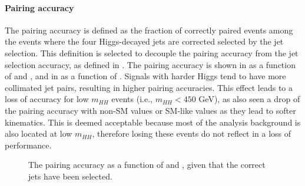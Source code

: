 \paragraph{Pairing accuracy} The pairing accuracy is defined as the fraction of correctly paired events among the events where the four Higgs-decayed jets are corrected selected by the jet selection. This definition is selected to decouple the pairing accuracy from the jet selection accuracy, as defined in \Sect{\ref{sec:sel-btag}}. The pairing accuracy is shown in \Fig{\ref{fig:pairingAcc-exists-4b}} as a function of \kl and \kvv, and in \Fig{\ref{fig:pairingAcc-mhh-exists-4b}} as a function of \mhh.
Signals with harder \pt Higgs tend to have more collimated jet pairs, resulting in higher pairing accuracies. 
This effect leads to a loss of accuracy for low $m_{HH}$ events (i.e., $m_{HH} < 450$ GeV), as also seen a drop of the pairing accuracy with non-SM \kl values or SM-like \kvv values as they lead to softer kinematics. This is deemed acceptable because most of the analysis background is also located at low $m_{HH}$, therefore losing these events do not reflect in a loss of performance.


\begin{figure}[hbt]
	\centering
	\caption{The pairing accuracy as a function of \kl and \kvv, given that the correct jets have been selected.}
	\label{fig:pairingAcc-exists-4b}
\end{figure}

